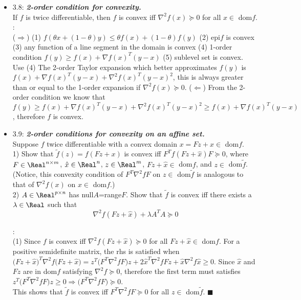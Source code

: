 \begin{itemize}
\item 3.8: {\bf\emph{2-order condition for convexity.}} \\ If $f$ is twice differentiable, then $f$
is convex iff $\nabla^2 f(x) \succeq 0$ for all $x \in$ dom$f$. \\ 

\Proof: \\ ($\Rightarrow$) (1)
$f(\theta x+(1-\theta)y) \le \theta f(x)+ (1-\theta)f(y)$ (2) epi$f$ is convex (3) any function of a
line segment in the domain is convex (4) 1-order condition $f(y) \ge f(x) + \nabla f(x)^T (y-x)$ (5)
sublevel set is convex. \\ Use (4) The 2-order Taylor expansion which better approximates $f(y)$ is
$f(x) + \nabla f(x)^T (y-x) + \nabla^2 f(x)^T(y-x)^2$, this is always greater than or equal to the
1-order expansion if $\nabla^2 f(x) \succeq 0$.  ($\Leftarrow$) From the 2-order condition we know
that $f(y) \ge f(x) + \nabla f(x)^T (y-x) + \nabla^2 f(x)^T(y-x)^2 \ge f(x) + \nabla f(x)^T (y-x)$,
therefore $f$ is convex.

\item 3.9: {\bf\emph{2-order conditions for convexity on an affine set.}} \\ 
Suppose $f$ twice differentiable with a convex domain $x= Fz+\hat{x} \in$ dom$f$. \\ 1) Show that
$\tilde{f}(z)= f(Fz+x)$ is convex iff $F^Tf(Fz+\hat{x})F \succeq 0$, where $F \in \Real^{n\times
m}$, $\hat{x} \in \Real^n$, $z \in \Real^m$, $Fz+\hat{x} \in$ dom$f$, and $z \in$ dom$\tilde{f}$.
(Notice, this convexity condition of $F^T\nabla^2 fF$ on $z \in$ dom$\tilde{f}$ is analogous to that
of $\nabla^2 f(x)$ on $x \in$ dom$f$.) \\ 2) $A \in \Real^{p\times n}$ has null$A$=range$F$. Show
that $\tilde{f}$ is convex iff there exists a $\lambda \in \Real$ such that 
\begin{equation}
   \nabla^2 f(Fz+\hat{x}) + \lambda A^TA \succeq 0 
\end{equation} 

\Proof: \\ 

(1) Since $f$ is convex iff $\nabla^2 f(Fz+\hat{x}) \succeq 0$ for all $Fz+\hat{x} \in$ dom$f$.  For a positive semidefinite
matrix, the rhs is satisfied when $\Big(Fz+\hat{x}\Big)^T \nabla^2 f \Big(Fz+\hat{x}\Big)=
z^T\big(F^T\nabla^2fF\big)z+ 2\hat{x}^T\nabla^2fFz+\hat{x}\nabla^2f\hat{x} \ge 0$.  Since $\hat{x}$
and $Fz$ are in dom$f$ satisfying $\nabla^2 f \succeq 0$, therefore the first term must satisfies
$z^T\big(F^T\nabla^2fF\big)z \ge 0 \Rightarrow \big(F^T\nabla^2fF\big) \succeq 0$.\\ This shows that
$\tilde{f}$ is convex iff $F^T\nabla^2fF \succeq 0$ for all $z \in$ dom$\tilde{f}$.  $\blacksquare$
    

\end{itemize}
